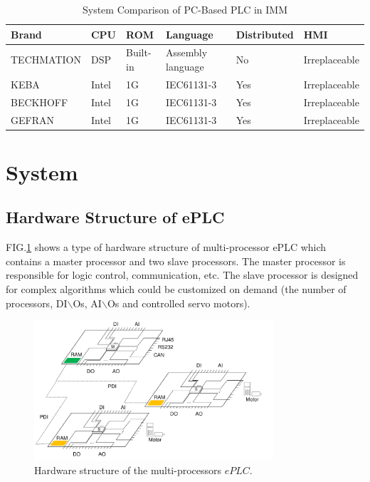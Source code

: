 \documentclass[journal,UTF8]{IEEEtran}
\begin{document}
\begin{table}
	\scriptsize \caption{System Comparison of PC-Based PLC in IMM}
	\label{table:IMMControllor}
	\begin{center}
		\renewcommand{\arraystretch}{1.4}
		\setlength\tabcolsep{3pt}
		\begin{tabular}{|p{1.6cm}|p{0.5cm}|p{0.8cm}|p{2cm}|p{1.1cm}|p{1.3cm}|}
			\hline
			Brand       & CPU    & ROM & Language       & Distributed  & HMI\\
			\hline
			TECHMATION  & DSP    & Built-in  & Assembly language        &No  & Irreplaceable \\
			\hline
			KEBA        & Intel  & 1G  & IEC61131-3                 &Yes    & Irreplaceable\\
			\hline
			BECKHOFF    & Intel  & 1G  & IEC61131-3               &Yes   &Irreplaceable\\
			\hline
			GEFRAN      & Intel  & 1G  &IEC61131-3                 &Yes   &Irreplaceable\\
			\hline
		\end{tabular}
	\end{center}
\end{table}
\section{System}
\label{MultiProcessorePLC}
\subsection{Hardware Structure of ePLC}
FIG.\ref{fig:HardwareStructure} shows a type of hardware structure of multi-processor ePLC which contains a master processor and two slave processors. The master processor is responsible for logic control, communication, etc. The slave processor is designed for complex algorithms which could be customized on demand (the number of processors, DI$\backslash$Os, AI$\backslash$Os and controlled servo motors).
\begin{figure}
	\centering
	\includegraphics[width=3.5in]{fig/FIG2.pdf}
	\caption{ Hardware structure of the multi-processors $ePLC$.}
	\label{fig:HardwareStructure}
\end{figure}
\end{document}
